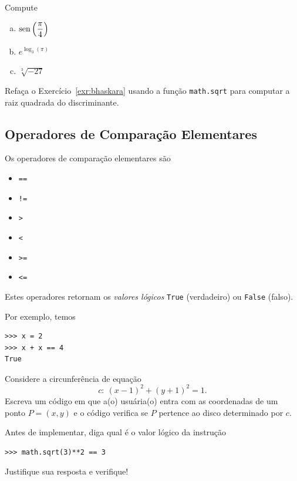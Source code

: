 \documentclass[12pt]{article}
\begin{document}
\begin{exr}
  Compute
  \begin{enumerate}[a)]
  \item $\displaystyle \operatorname{sen}\left(\frac{\pi}{4}\right)$
  \item $\displaystyle e^{\log_3(\pi)}$
  \item $\displaystyle \sqrt[3]{-27}$
  \end{enumerate}
\end{exr}

\begin{exr}
  Refaça o Exercício~\ref{exr:bhaskara} usando a função \lstinline+math.sqrt+ para computar a raiz quadrada do discriminante.
\end{exr}

\subsection{Operadores de Comparação Elementares}

Os operadores de comparação elementares são
\begin{itemize}
\item[]\lstinline+==+ 
\item[]\lstinline+!=+ 
\item[]\lstinline+>+ 
\item[]\lstinline+<+ 
\item[]\lstinline+>=+ 
\item[]\lstinline+<=+ 
\end{itemize}
Estes operadores retornam os \emph{valores lógicos} \lstinline+True+ (verdadeiro) ou \lstinline+False+ (falso).

Por exemplo, temos

\begin{lstlisting}
>>> x = 2
>>> x + x == 4
True
\end{lstlisting}

\begin{exr}
  Considere a circunferência de equação
  \begin{equation}
    c: ~(x - 1)^2 + (y + 1)^2 = 1.
  \end{equation}
  Escreva um código em que a(o) usuária(o) entra com as coordenadas de um ponto $P = (x, y)$ e o código verifica se $P$ pertence ao disco determinado por $c$.
\end{exr}

\begin{exr}
  Antes de implementar, diga qual é o valor lógico da instrução

\begin{lstlisting}
>>> math.sqrt(3)**2 == 3
\end{lstlisting}

Justifique sua resposta e verifique!
\end{exr}
\end{document}
